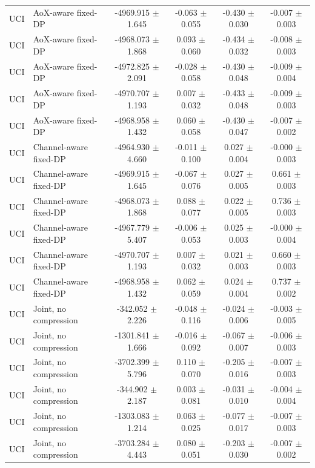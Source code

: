 \begin{table}[t]
\begin{tabular}{llcccc}
UCI & AoX-aware fixed-DP & -4969.915 $\pm$ 1.645 & -0.063 $\pm$ 0.055 & -0.430 $\pm$ 0.030 & -0.007 $\pm$ 0.003 \\
UCI & AoX-aware fixed-DP & -4968.073 $\pm$ 1.868 & 0.093 $\pm$ 0.060 & -0.434 $\pm$ 0.032 & -0.008 $\pm$ 0.003 \\
UCI & AoX-aware fixed-DP & -4972.825 $\pm$ 2.091 & -0.028 $\pm$ 0.058 & -0.430 $\pm$ 0.048 & -0.009 $\pm$ 0.004 \\
UCI & AoX-aware fixed-DP & -4970.707 $\pm$ 1.193 & 0.007 $\pm$ 0.032 & -0.433 $\pm$ 0.048 & -0.009 $\pm$ 0.003 \\
UCI & AoX-aware fixed-DP & -4968.958 $\pm$ 1.432 & 0.060 $\pm$ 0.058 & -0.430 $\pm$ 0.047 & -0.007 $\pm$ 0.002 \\
UCI & Channel-aware fixed-DP & -4964.930 $\pm$ 4.660 & -0.011 $\pm$ 0.100 & 0.027 $\pm$ 0.004 & -0.000 $\pm$ 0.003 \\
UCI & Channel-aware fixed-DP & -4969.915 $\pm$ 1.645 & -0.067 $\pm$ 0.076 & 0.027 $\pm$ 0.005 & 0.661 $\pm$ 0.003 \\
UCI & Channel-aware fixed-DP & -4968.073 $\pm$ 1.868 & 0.088 $\pm$ 0.077 & 0.022 $\pm$ 0.005 & 0.736 $\pm$ 0.003 \\
UCI & Channel-aware fixed-DP & -4967.779 $\pm$ 5.407 & -0.006 $\pm$ 0.053 & 0.025 $\pm$ 0.003 & -0.000 $\pm$ 0.004 \\
UCI & Channel-aware fixed-DP & -4970.707 $\pm$ 1.193 & 0.007 $\pm$ 0.032 & 0.021 $\pm$ 0.003 & 0.660 $\pm$ 0.003 \\
UCI & Channel-aware fixed-DP & -4968.958 $\pm$ 1.432 & 0.062 $\pm$ 0.059 & 0.024 $\pm$ 0.004 & 0.737 $\pm$ 0.002 \\
UCI & Joint, no compression & -342.052 $\pm$ 2.226 & -0.048 $\pm$ 0.116 & -0.024 $\pm$ 0.006 & -0.003 $\pm$ 0.005 \\
UCI & Joint, no compression & -1301.841 $\pm$ 1.666 & -0.016 $\pm$ 0.092 & -0.067 $\pm$ 0.007 & -0.006 $\pm$ 0.003 \\
UCI & Joint, no compression & -3702.399 $\pm$ 5.796 & 0.110 $\pm$ 0.070 & -0.205 $\pm$ 0.016 & -0.007 $\pm$ 0.003 \\
UCI & Joint, no compression & -344.902 $\pm$ 2.187 & 0.003 $\pm$ 0.081 & -0.031 $\pm$ 0.010 & -0.004 $\pm$ 0.004 \\
UCI & Joint, no compression & -1303.083 $\pm$ 1.214 & 0.063 $\pm$ 0.025 & -0.077 $\pm$ 0.017 & -0.007 $\pm$ 0.003 \\
UCI & Joint, no compression & -3703.284 $\pm$ 4.443 & 0.080 $\pm$ 0.051 & -0.203 $\pm$ 0.030 & -0.007 $\pm$ 0.002 \\

\end{tabular}
\end{table}
